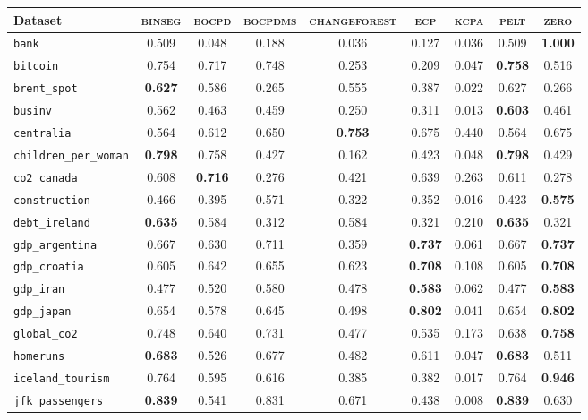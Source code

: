 \begin{tabular}{lcccccccc}
Dataset & \textsc{binseg} & \textsc{bocpd} & \textsc{bocpdms} & \textsc{changeforest} & \textsc{ecp} & \textsc{kcpa} & \textsc{pelt} & \textsc{zero}\\
\toprule
\verb+bank+ & 0.509 & 0.048 & 0.188 & 0.036 & 0.127 & 0.036 & 0.509 & \textbf{1.000}\\
\verb+bitcoin+ & 0.754 & 0.717 & 0.748 & 0.253 & 0.209 & 0.047 & \textbf{0.758} & 0.516\\
\verb+brent_spot+ & \textbf{0.627} & 0.586 & 0.265 & 0.555 & 0.387 & 0.022 & 0.627 & 0.266\\
\verb+businv+ & 0.562 & 0.463 & 0.459 & 0.250 & 0.311 & 0.013 & \textbf{0.603} & 0.461\\
\verb+centralia+ & 0.564 & 0.612 & 0.650 & \textbf{0.753} & 0.675 & 0.440 & 0.564 & 0.675\\
\verb+children_per_woman+ & \textbf{0.798} & 0.758 & 0.427 & 0.162 & 0.423 & 0.048 & \textbf{0.798} & 0.429\\
\verb+co2_canada+ & 0.608 & \textbf{0.716} & 0.276 & 0.421 & 0.639 & 0.263 & 0.611 & 0.278\\
\verb+construction+ & 0.466 & 0.395 & 0.571 & 0.322 & 0.352 & 0.016 & 0.423 & \textbf{0.575}\\
\verb+debt_ireland+ & \textbf{0.635} & 0.584 & 0.312 & 0.584 & 0.321 & 0.210 & \textbf{0.635} & 0.321\\
\verb+gdp_argentina+ & 0.667 & 0.630 & 0.711 & 0.359 & \textbf{0.737} & 0.061 & 0.667 & \textbf{0.737}\\
\verb+gdp_croatia+ & 0.605 & 0.642 & 0.655 & 0.623 & \textbf{0.708} & 0.108 & 0.605 & \textbf{0.708}\\
\verb+gdp_iran+ & 0.477 & 0.520 & 0.580 & 0.478 & \textbf{0.583} & 0.062 & 0.477 & \textbf{0.583}\\
\verb+gdp_japan+ & 0.654 & 0.578 & 0.645 & 0.498 & \textbf{0.802} & 0.041 & 0.654 & \textbf{0.802}\\
\verb+global_co2+ & 0.748 & 0.640 & 0.731 & 0.477 & 0.535 & 0.173 & 0.638 & \textbf{0.758}\\
\verb+homeruns+ & \textbf{0.683} & 0.526 & 0.677 & 0.482 & 0.611 & 0.047 & \textbf{0.683} & 0.511\\
\verb+iceland_tourism+ & 0.764 & 0.595 & 0.616 & 0.385 & 0.382 & 0.017 & 0.764 & \textbf{0.946}\\
\verb+jfk_passengers+ & \textbf{0.839} & 0.541 & 0.831 & 0.671 & 0.438 & 0.008 & \textbf{0.839} & 0.630\\

\end{tabular}
